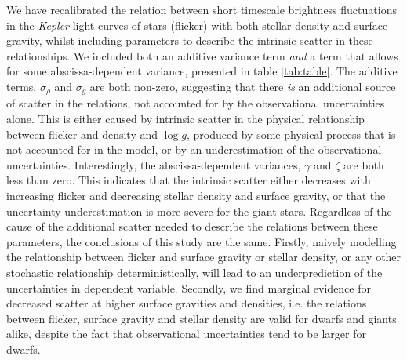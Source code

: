 \documentclass[apjl]{emulateapj}
\newcommand{\logg}{$\log g$}
\begin{document}
We have recalibrated the relation between short timescale brightness
fluctuations in the {\it Kepler} light curves of stars (flicker) with both
stellar density and surface gravity, whilst including parameters to describe
the intrinsic scatter in these relationships.
We included both an additive variance term {\it and} a term that allows for
some abscissa-dependent variance, presented in table \ref{tab:table}.
The additive terms, $\sigma_\rho$ and $ \sigma_g$ are both non-zero,
suggesting that there {\it is} an additional source of scatter in the
relations, not accounted for by the observational uncertainties alone.
This is either caused by intrinsic scatter in the physical relationship
between flicker and density and \logg, produced by some physical process that
is not accounted for in the model, or by an underestimation of the
observational uncertainties.
Interestingly, the abscissa-dependent variances, $\gamma$ and $\zeta$ are both
less than zero.
This indicates that the intrinsic scatter either decreases with increasing
flicker and decreasing stellar density and surface gravity, or that the
uncertainty underestimation is more severe for the giant stars.
Regardless of the cause of the additional scatter needed to describe the
relations between these parameters, the conclusions of this study are the same.
Firstly, naively modelling the relationship between flicker and surface
gravity or stellar density, or any other stochastic relationship
deterministically, will lead to an underprediction of the uncertainties in
dependent variable.
Secondly, we find marginal evidence for decreased scatter at higher surface
gravities and densities, i.e. the relations between flicker, surface gravity
and stellar density are valid for dwarfs and giants alike, despite the fact
that observational uncertainties tend to be larger for dwarfs.
\end{document}
